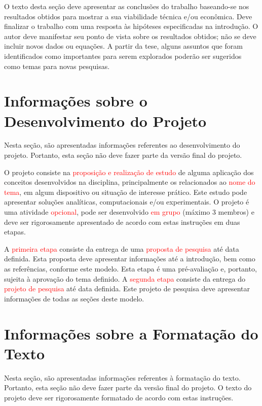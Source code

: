 \documentclass[%
  article,%
  10pt,%
  a4paper,%
  fleqn,%
  oneside,%
  sumario = tradicional,%
  chapter = TITLE,%
  section = TITLE,%
]{abntex2}
\begin{document}
O texto desta seção deve apresentar as conclusões do trabalho baseando-se nos resultados obtidos para mostrar a sua viabilidade técnica e/ou econômica. Deve finalizar o trabalho com uma resposta às hipóteses especificadas na introdução. O autor deve manifestar seu ponto de vista sobre os resultados obtidos; não se deve incluir novos dados ou equações. A partir da tese, alguns assuntos que foram identificados como importantes para serem explorados poderão ser sugeridos como temas para novas pesquisas.

\section{Informações sobre o Desenvolvimento do Projeto}\label{sec:infoproj}

Nesta seção, são apresentadas informações referentes ao desenvolvimento do projeto. Portanto, esta seção não deve fazer parte da versão final do projeto.

O projeto consiste na \textcolor{red}{proposição e realização de estudo} de alguma aplicação dos conceitos desenvolvidos na disciplina, principalmente os relacionados ao \textcolor{red}{nome do tema}, em algum dispositivo ou situação de interesse prático. Este estudo pode apresentar soluções analíticas, computacionais e/ou experimentais. O projeto é uma atividade \textcolor{red}{opcional}, pode ser desenvolvido \textcolor{red}{em grupo} (máximo 3 membros) e deve ser rigorosamente apresentado de acordo com estas instruções em duas etapas.

A \textcolor{red}{primeira etapa} consiste da entrega de uma \textcolor{red}{proposta de pesquisa} até data definida. Esta proposta deve apresentar informações até a introdução, bem como as referências, conforme este modelo. Esta etapa é uma pré-avaliação e, portanto, sujeita à aprovação do tema definido. A \textcolor{red}{segunda etapa} consiste da entrega do \textcolor{red}{projeto de pesquisa} até data definida. Este projeto de pesquisa deve apresentar informações de todas as seções deste modelo.

\section{Informações sobre a Formatação do Texto}\label{sec:infoform}

Nesta seção, são apresentadas informações referentes à formatação do texto. Portanto, esta seção não deve fazer parte da versão final do projeto. O texto do projeto deve ser rigorosamente formatado de acordo com estas instruções.
\end{document}
